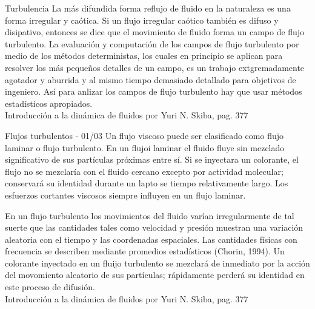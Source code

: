 \begin{frame}{Turbulencia}
\justifying
La más difundida forma reflujo de fluido en la naturaleza es una forma irregular y caótica.
Si un flujo irregular caótico también es difuso y disipativo, entonces se dice que el movimiento de fluido forma un campo de flujo turbulento. La evaluación y computación de los campos de flujo turbulento por medio de los métodos deterministas, los cuales en principio se aplican para resolver los más pequeños detalles de un campo, es un trabajo extgremadamente agotador y aburrida y al mismo tiempo demasiado detallado para objetivos de ingeniero. Así para anlizar los campos de flujo turbulento hay que usar métodos estadísticos apropiados.\\
{\tiny Introducción a la dinámica de fluidos por Yuri N. Skiba, pag. 377}
\end{frame}

\begin{frame}{Flujos turbulentos - 01/03}
\justifying
Un flujo viscoso puede ser clasificado como flujo laminar o flujo turbulento. En un flujoi laminar el fluido fluye sin mezclado significativo de sus partículas próximas entre sí. Si se inyectara un colorante, el flujo no se mezclaría con el fluido cercano excepto por actividad molecular; conservará su identidad durante un lapto se tiempo relativamente largo. Los esfuerzos cortantes viscosos siempre influyen en un flujo laminar.

En un flujo turbulento los movimientos del fluido varían irregularmente de tal suerte que las cantidades tales como velocidad y presión muestran una variación aleatoria con el tiempo y las coordenadas espaciales. Las cantidades físicas con frecuencia se describen mediante promedios estadísticos (Chorin, 1994). Un colorante inyectado en un fluijo turbulento se mezclará de inmediato por la acción del movomiento aleatorio de sus partículas; rápidamente perderá su identidad en este proceso de difusión.\\
{\tiny Introducción a la dinámica de fluidos por Yuri N. Skiba, pag. 377}
\end{frame}

